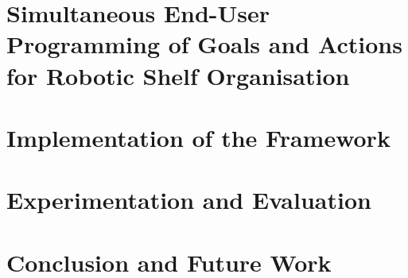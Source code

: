 \documentclass[a4paper,12pt,twoside,openany]{book}
\theoremstyle{definition}
\theoremstyle{remark}
\begin{document}
\chapter{Simultaneous End-User Programming of Goals and Actions for Robotic Shelf Organisation}\label{chap:OrganisingTasks}
\minitoc%


\chapter{Implementation of the Framework}\label{chap:Implementation}
\minitoc%


\chapter{Experimentation and Evaluation}\label{chap:Evaluation}
\minitoc%



\chapter{Conclusion and Future Work}\label{chap:Conclusion}
\minitoc%



\clearpage



%
\end{document}
